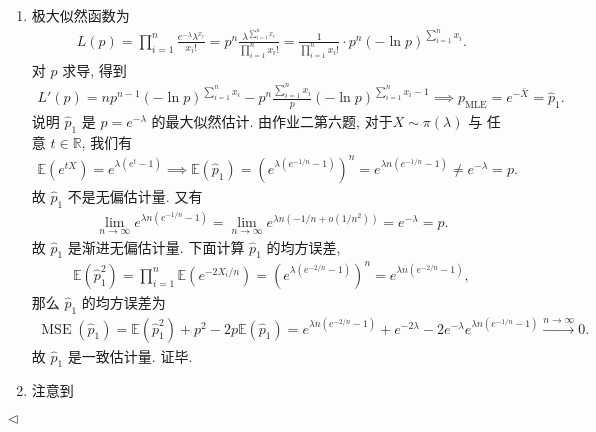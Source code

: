 \documentclass[11pt]{article}
\newenvironment{answer}[1][Solution]{\begin{trivlist}
    \item[\hskip \labelsep {\bfseries #1.}\hskip \labelsep]}{\hfill$\lhd$\end{trivlist}}
\newcommand\1{\mathds{1}}
\newcommand\R{\mathbb{R}}
\newcommand\E{\mathbb{E}}
\newcommand{\arrp}{\xrightarrow{P}}
\newcommand{\arri}{\xrightarrow{n\rightarrow\infty}}
\DeclareMathOperator{\MSE}{MSE}
\begin{document}
\begin{answer}
    \begin{enumerate}[label=(\arabic*)]
        \item 极大似然函数为
        \begin{align*}
            L(p) = \prod_{i=1}^{n} \frac{e^{-\lambda}\lambda^{x_i}}{x_i!} = p^n \frac{\lambda^{\sum_{i=1}^{n}x_i}}{\prod_{i=1}^{n}x_i!} = \frac{1}{\prod_{i=1}^{n}x_i !}\cdot p^n (-\ln p)^{\sum_{i=1}^{n}x_i}.
        \end{align*}
        对 $p$ 求导, 得到
        \begin{align*}
            L'(p) = n p^{n-1}(-\ln p)^{\sum_{i=1}^{n}x_i} - p^n \frac{\sum_{i=1}^{n}x_i}{p}(-\ln p)^{\sum_{i=1}^{n}x_i - 1} \implies p_{\mathrm{MLE}} = e^{-\bar{X}} = \hat{p}_1.
        \end{align*}
        说明 $\hat{p}_1$ 是 $p = e^{-\lambda}$ 的最大似然估计. 由作业二第六题, 对于$X\sim \pi(\lambda)$ 与 任意 $t\in \R$, 我们有
        \begin{align*}
            \E\left(e^{tX}\right) = e^{\lambda(e^t - 1)} \implies \E\left(\hat{p}_1\right) = \left(e^{\lambda(e^{-1/n} - 1)}\right)^n = e^{\lambda n(e^{-1/n} - 1)} \neq e^{-\lambda} = p.
        \end{align*}
        故 $\hat{p}_1$ 不是无偏估计量. 又有
        \begin{align*}
            \lim_{n\to \infty}e^{\lambda n(e^{-1/n} - 1)}  = \lim_{n\to \infty} e^{\lambda n(-1/n + o(1/n^2))} = e^{-\lambda} = p.
        \end{align*}
        故 $\hat{p}_1$ 是渐进无偏估计量.
        下面计算 $\hat{p}_1$ 的均方误差,
        \begin{align*}
            \E\left(\hat{p}_1^2\right) = \prod_{i=1}^{n} \E\left(e^{-2X_i/n}\right) = \left(e^{\lambda(e^{-2/n} - 1)}\right)^n = e^{\lambda n(e^{-2/n} - 1)},
        \end{align*}
        那么 $\hat{p}_1$ 的均方误差为
        \begin{align*}
            \MSE(\hat{p}_1) = \E\left(\hat{p}_1^2\right) + p^2 - 2p\E(\hat{p}_1) = e^{\lambda n(e^{-2/n} - 1)} + e^{-2\lambda} - 2e^{-\lambda}e^{\lambda n(e^{-1/n} - 1)} \arri 0.
        \end{align*}
        故 $\hat{p}_1$ 是一致估计量. 证毕.
        \item 注意到

\end{enumerate}
\end{answer}
\end{document}
